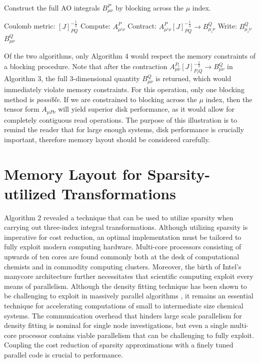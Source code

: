 \begin{algorithm}[H]
\caption{Construct the full AO integrals $B_{\mu \nu}^P$ by blocking across the $\mu$ index.}
\begin{algorithmic}
\REQUIRE Coulomb metric: $[J]_{PQ}^{-\frac{1}{2}}$
    \STATE Compute:  $A_{\mu^i \nu}^{P}$
    \STATE Contract: $A_{\mu^i \nu}^{P}[J]_{PQ}^{-\frac{1}{2}} \rightarrow B_{\mu_i \nu}^Q$
    \STATE Write:    $B_{\mu_i \nu}^Q$
\ENDFOR
\RETURN $B_{\mu \nu}^Q$
\end{algorithmic}
\end{algorithm}

Of the two algorithms, only Algorithm 4 would respect the memory constraints of a blocking procedure. Note that after the 
contraction $A_{\mu \nu}^{P_i} [J]_{P_iQ}^{-\frac{1}{2}} \rightarrow B_{\mu \nu}^Q$ in Algorithm 3, the full 3-dimensional quantity
$B_{\mu \nu}^Q$ is returned, which would immediately violate memory constraints. For this operation, only one blocking method is
\textit{possible}. If we are constrained to blocking across the $\mu$ index, then the tensor form $A_{\mu P \nu}$ will yield
superior disk performance, as it would allow for completely contiguous read operations. The purpose of this illustration is
to remind the reader that for large enough systems, disk performance
is crucially important, therefore memory layout should be considered carefully.

\section{Memory Layout for Sparsity-utilized Transformations}

Algorithm 2 revealed a technique that can be used to utilize sparsity when carrying out three-index integral transformations.
Although utilizing sparsity is imperative for cost reduction, an optimal implementation must be tailored to
fully exploit modern computing hardware.
Multi-core processors consisting of upwards of ten cores are found commonly both at the desk of computational
chemists and in commodity computing clusters.
Moreover, the birth of Intel's manycore architecture further necessitates that scientific computing
exploit every means of parallelism.
Although the density fitting technique has been shown to be challenging to exploit in massively parallel
algorithms \cite{ref3}, it remains an essential technique for accelerating computations of 
small to intermediate size chemical systems.
The communication overhead that hinders large scale parallelism for density
fitting is nominal for single node investigations, but even a single multi-core processor contains viable
parallelism that can be challenging to fully exploit. 
Coupling the cost reduction of sparsity approximations with a finely tuned parallel code is crucial to performance.  


